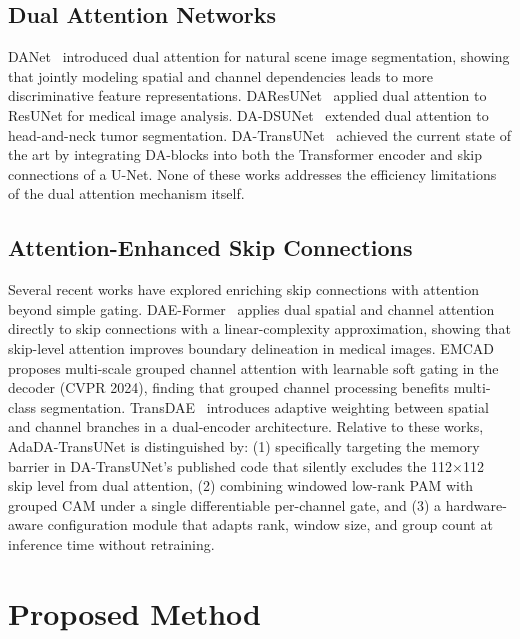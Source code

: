 \documentclass[conference]{IEEEtran}
\begin{document}
\subsection{Dual Attention Networks}

DANet~\cite{fu2019dual} introduced dual attention for natural scene image segmentation, showing that jointly modeling spatial and channel dependencies leads to more discriminative feature representations. DAResUNet~\cite{shi2020daResunet} applied dual attention to ResUNet for medical image analysis. DA-DSUNet~\cite{tang2022daDSunet} extended dual attention to head-and-neck tumor segmentation. DA-TransUNet~\cite{sun2024datransunet} achieved the current state of the art by integrating DA-blocks into both the Transformer encoder and skip connections of a U-Net. None of these works addresses the efficiency limitations of the dual attention mechanism itself.

\subsection{Attention-Enhanced Skip Connections}

Several recent works have explored enriching skip connections with attention beyond simple gating. DAE-Former~\cite{azad2023daeformer} applies dual spatial and channel attention directly to skip connections with a linear-complexity approximation, showing that skip-level attention improves boundary delineation in medical images. EMCAD~\cite{rahman2024emcad} proposes multi-scale grouped channel attention with learnable soft gating in the decoder (CVPR 2024), finding that grouped channel processing benefits multi-class segmentation. TransDAE~\cite{azad2024transdae} introduces adaptive weighting between spatial and channel branches in a dual-encoder architecture. Relative to these works, AdaDA-TransUNet is distinguished by: (1) specifically targeting the memory barrier in DA-TransUNet's published code that silently excludes the 112$\times$112 skip level from dual attention, (2) combining windowed low-rank PAM with grouped CAM under a single differentiable per-channel gate, and (3) a hardware-aware configuration module that adapts rank, window size, and group count at inference time without retraining.


\section{Proposed Method}
\end{document}
